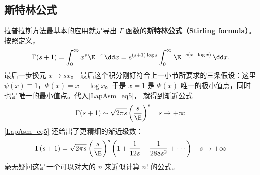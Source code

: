 \subsection{斯特林公式}
拉普拉斯方法最基本的应用就是导出 $\Gamma$ 函数的\textbf{斯特林公式（Stirling formula）}。 按照定义，
\[
  \Gamma(s+1)
  =\int_0^\infty x^s\E^{-x}\,\dd x
  =e^{(s+1)\log s}\int_0^\infty \E^{-s(x-\log x)}\,\dd x.
\]
最后一步换元 $x\mapsto sx$。 最后这个积分刚好符合上一小节所要求的三条假设：这里 $\psi(x)\equiv1$，$\Phi(x)=x-\log x$。于是 $x=1$ 是 $\Phi(x)$ 唯一的极小值点，同时也是唯一的最小值点。代入\autoref{LapAsm_eq5}， 就得到渐近公式
\[
  \Gamma(s+1)\sim\sqrt{2\pi s}\left(\frac{s}{\E}\right)^s\quad s\to+\infty
\]
\autoref{LapAsm_eq5} 还给出了更精细的渐近级数：
\[
  \Gamma(s+1)
  =\sqrt{2\pi s}\left({s\over \E}\right)^s
  \left(
   1+{1\over12s}+{1\over288 s^2}+ \cdots
  \right)\quad s\to+\infty
\]
毫无疑问这是一个可以对大的 $n$ 来近似计算 $n!$ 的公式。
